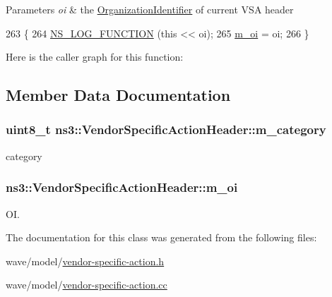 \begin{DoxyParams}{Parameters}
{\em oi} & the \hyperlink{classns3_1_1OrganizationIdentifier}{Organization\+Identifier} of current V\+SA header \\
\hline
\end{DoxyParams}

\begin{DoxyCode}
263 \{
264   \hyperlink{log-macros-disabled_8h_a90b90d5bad1f39cb1b64923ea94c0761}{NS\_LOG\_FUNCTION} (\textcolor{keyword}{this} << oi);
265   \hyperlink{classns3_1_1VendorSpecificActionHeader_a026ab2e6e0cd5fdc3270f8fcefc95db4}{m\_oi} = oi;
266 \}
\end{DoxyCode}


Here is the caller graph for this function\+:




\subsection{Member Data Documentation}
\subsubsection[{\texorpdfstring{m\+\_\+category}{m_category}}]{\setlength{\rightskip}{0pt plus 5cm}uint8\+\_\+t ns3\+::\+Vendor\+Specific\+Action\+Header\+::m\+\_\+category\hspace{0.3cm}{\ttfamily [private]}}\hypertarget{classns3_1_1VendorSpecificActionHeader_a2fc4b586a5cbba95b3a7e64b50f5d719}{}\label{classns3_1_1VendorSpecificActionHeader_a2fc4b586a5cbba95b3a7e64b50f5d719}


category 

\subsubsection[{\texorpdfstring{m\+\_\+oi}{m_oi}}]{ ns3\+::\+Vendor\+Specific\+Action\+Header\+::m\+\_\+oi\hspace{0.3cm}{\ttfamily [private]}}\hypertarget{classns3_1_1VendorSpecificActionHeader_a026ab2e6e0cd5fdc3270f8fcefc95db4}{}\label{classns3_1_1VendorSpecificActionHeader_a026ab2e6e0cd5fdc3270f8fcefc95db4}


OI. 



The documentation for this class was generated from the following files\+:\begin{DoxyCompactItemize}
\item 
wave/model/\hyperlink{vendor-specific-action_8h}{vendor-\/specific-\/action.\+h}\item 
wave/model/\hyperlink{vendor-specific-action_8cc}{vendor-\/specific-\/action.\+cc}\end{DoxyCompactItemize}
